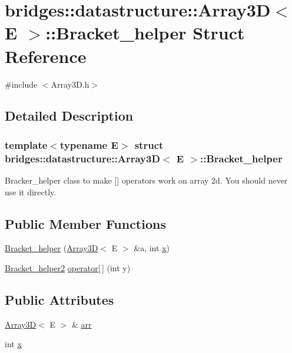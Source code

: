\hypertarget{structbridges_1_1datastructure_1_1_array3_d_1_1_bracket__helper}{}\section{bridges\+:\+:datastructure\+:\+:Array3D$<$ E $>$\+:\+:Bracket\+\_\+helper Struct Reference}
\label{structbridges_1_1datastructure_1_1_array3_d_1_1_bracket__helper}


{\ttfamily \#include $<$Array3\+D.\+h$>$}



\subsection{Detailed Description}
\subsubsection*{template$<$typename E$>$\newline
struct bridges\+::datastructure\+::\+Array3\+D$<$ E $>$\+::\+Bracket\+\_\+helper}

Bracker\+\_\+helper class to make \mbox{[}\mbox{]} operators work on array 2d. You should never use it directly. \subsection*{Public Member Functions}
\begin{DoxyCompactItemize}
\item 
\hyperlink{structbridges_1_1datastructure_1_1_array3_d_1_1_bracket__helper_a02888ffe46f3f1bfc8dda232bd2a3634}{Bracket\+\_\+helper} (\hyperlink{classbridges_1_1datastructure_1_1_array3_d}{Array3D}$<$ E $>$ \&a, int \hyperlink{structbridges_1_1datastructure_1_1_array3_d_1_1_bracket__helper_a66c392b3d6f3a326f632099c596d175c}{x})
\item 
\hyperlink{structbridges_1_1datastructure_1_1_array3_d_1_1_bracket__helper2}{Bracket\+\_\+helper2} \hyperlink{structbridges_1_1datastructure_1_1_array3_d_1_1_bracket__helper_ac5abb4226f77526ae2b77d96fd98f9fa}{operator\mbox{[}$\,$\mbox{]}} (int y)
\end{DoxyCompactItemize}
\subsection*{Public Attributes}
\begin{DoxyCompactItemize}
\item 
\hyperlink{classbridges_1_1datastructure_1_1_array3_d}{Array3D}$<$ E $>$ \& \hyperlink{structbridges_1_1datastructure_1_1_array3_d_1_1_bracket__helper_a103a7f1a8a32dd0109f9ef278407d49f}{arr}
\item 
int \hyperlink{structbridges_1_1datastructure_1_1_array3_d_1_1_bracket__helper_a66c392b3d6f3a326f632099c596d175c}{x}
\end{DoxyCompactItemize}


